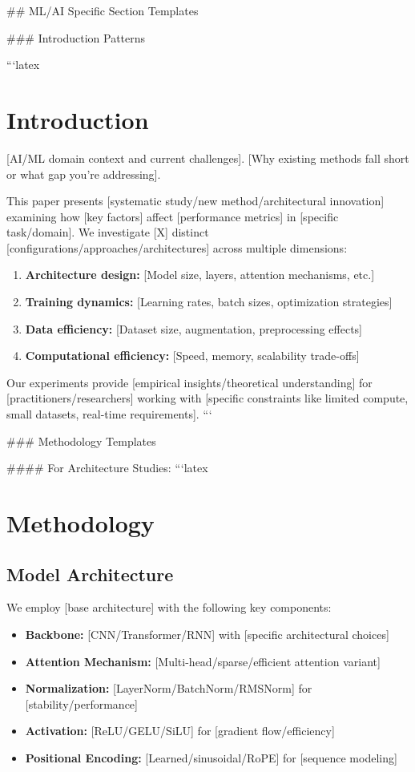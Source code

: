 \documentclass[11pt,a4paper]{article}
\begin{document}
## ML/AI Specific Section Templates

### Introduction Patterns

```latex
\section{Introduction}
[AI/ML domain context and current challenges]. [Why existing methods fall short or what gap you're addressing].

This paper presents [systematic study/new method/architectural innovation] examining how [key factors] affect [performance metrics] in [specific task/domain]. We investigate [X] distinct [configurations/approaches/architectures] across multiple dimensions:

\begin{enumerate}
    \item \textbf{Architecture design:} [Model size, layers, attention mechanisms, etc.]
    \item \textbf{Training dynamics:} [Learning rates, batch sizes, optimization strategies]
    \item \textbf{Data efficiency:} [Dataset size, augmentation, preprocessing effects]
    \item \textbf{Computational efficiency:} [Speed, memory, scalability trade-offs]
\end{enumerate}

Our experiments provide [empirical insights/theoretical understanding] for [practitioners/researchers] working with [specific constraints like limited compute, small datasets, real-time requirements].
```

### Methodology Templates

#### For Architecture Studies:
```latex
\section{Methodology}

\subsection{Model Architecture}
We employ [base architecture] with the following key components:

\begin{itemize}
    \item \textbf{Backbone:} [CNN/Transformer/RNN] with [specific architectural choices]
    \item \textbf{Attention Mechanism:} [Multi-head/sparse/efficient attention variant]
    \item \textbf{Normalization:} [LayerNorm/BatchNorm/RMSNorm] for [stability/performance]
    \item \textbf{Activation:} [ReLU/GELU/SiLU] for [gradient flow/efficiency]
    \item \textbf{Positional Encoding:} [Learned/sinusoidal/RoPE] for [sequence modeling]
\end{itemize}
\end{document}
